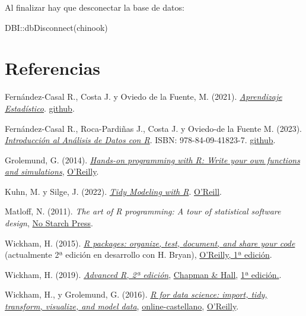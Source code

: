 \documentclass[
]{book}
\newenvironment{Shaded}{\begin{snugshade}}{\end{snugshade}}
\newcommand{\FunctionTok}[1]{\textcolor[rgb]{0.00,0.00,0.00}{#1}}
\newcommand{\NormalTok}[1]{#1}
\newcommand{\SpecialCharTok}[1]{\textcolor[rgb]{0.00,0.00,0.00}{#1}}
\theoremstyle{break}
\theoremstyle{nonumberplain}
\begin{document}
Al finalizar hay que desconectar la base de datos:

\begin{Shaded}
\begin{Highlighting}[]
\NormalTok{DBI}\SpecialCharTok{::}\FunctionTok{dbDisconnect}\NormalTok{(chinook)            }
\end{Highlighting}
\end{Shaded}

\hypertarget{referencias}{%
\chapter*{Referencias}\label{referencias}}

Fernández-Casal R., Costa J. y Oviedo de la Fuente, M. (2021). \emph{\href{https://rubenfcasal.github.io/aprendizaje_estadistico}{Aprendizaje Estadístico}}. \href{https://github.com/rubenfcasal/aprendizaje_estadistico}{github}.

Fernández-Casal R., Roca-Pardiñas J., Costa J. y Oviedo-de la Fuente M. (2023). \emph{\href{https://rubenfcasal.github.io/intror}{Introducción al Análisis de Datos con R}}. ISBN: 978-84-09-41823-7. \href{https://github.com/rubenfcasal/intror}{github}.

Grolemund, G. (2014). \emph{\href{https://rstudio-education.github.io/hopr}{Hands-on programming with R: Write your own functions and simulations}}, \href{http://shop.oreilly.com/product/0636920028574.do}{O'Reilly}.

Kuhn, M. y Silge, J. (2022). \emph{\href{https://www.tmwr.org}{Tidy Modeling with R}}. \href{https://amzn.to/35Hn96s}{O'Reill}.

Matloff, N. (2011). \emph{The art of R programming: A tour of statistical software design}, \href{https://www.nostarch.com/artofr.htm}{No Starch Press}.

Wickham, H. (2015). \emph{\href{http://r-pkgs.had.co.nz/}{R packages: organize, test, document, and share your code}} (actualmente 2ª edición en desarrollo con H. Bryan), \href{http://shop.oreilly.com/product/0636920034421.do}{O'Reilly, 1ª edición}.

Wickham, H. (2019). \emph{\href{https://adv-r.hadley.nz/}{Advanced R, 2ª edición}}, \href{https://www.amazon.com/dp/0815384572}{Chapman \& Hall}, \href{http://adv-r.had.co.nz/}{1ª edición.}.

Wickham, H., y Grolemund, G. (2016). \emph{\href{http://r4ds.had.co.nz}{R for data science: import, tidy, transform, visualize, and model data}}, \href{https://es.r4ds.hadley.nz}{online-castellano}, \href{http://shop.oreilly.com/product/0636920034407.do}{O'Reilly}.
\end{document}
